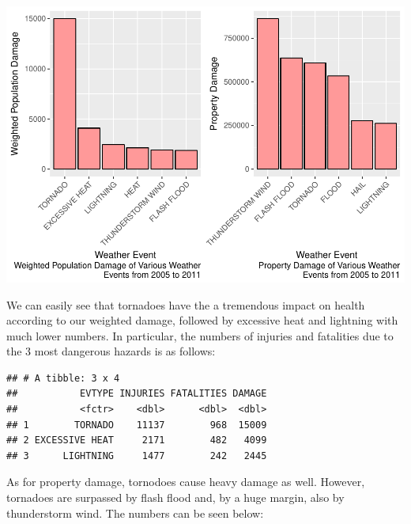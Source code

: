 \documentclass[]{article}
\newenvironment{Shaded}{\begin{snugshade}}{\end{snugshade}}
\newcommand{\KeywordTok}[1]{\textcolor[rgb]{0.13,0.29,0.53}{\textbf{{#1}}}}
\newcommand{\StringTok}[1]{\textcolor[rgb]{0.31,0.60,0.02}{{#1}}}
\newcommand{\NormalTok}[1]{{#1}}
\begin{document}
\includegraphics{StormData_files/figure-latex/b-1.pdf}

We can easily see that tornadoes have the a tremendous impact on health
according to our weighted damage, followed by excessive heat and
lightning with much lower numbers. In particular, the numbers of
injuries and fatalities due to the 3 most dangerous hazards is as
follows:

\begin{Shaded}
\end{Shaded}

\begin{verbatim}
## # A tibble: 3 x 4
##           EVTYPE INJURIES FATALITIES DAMAGE
##           <fctr>    <dbl>      <dbl>  <dbl>
## 1        TORNADO    11137        968  15009
## 2 EXCESSIVE HEAT     2171        482   4099
## 3      LIGHTNING     1477        242   2445
\end{verbatim}

As for property damage, tornodoes cause heavy damage as well. However,
tornadoes are surpassed by flash flood and, by a huge margin, also by
thunderstorm wind. The numbers can be seen below:

\begin{Shaded}
\end{Shaded}
\end{document}
